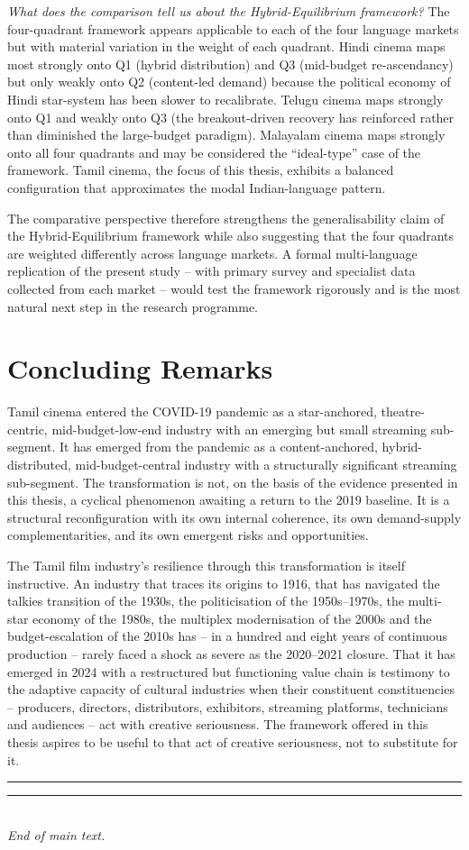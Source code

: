 \textit{What does the comparison tell us about the
Hybrid-Equilibrium framework?}  The four-quadrant framework appears
applicable to each of the four language markets but with
material variation in the weight of each quadrant.  Hindi cinema
maps most strongly onto Q1 (hybrid distribution) and Q3 (mid-budget
re-ascendancy) but only weakly onto Q2 (content-led demand)
because the political economy of Hindi star-system has been slower
to recalibrate.  Telugu cinema maps strongly onto Q1 and weakly
onto Q3 (the breakout-driven recovery has reinforced rather than
diminished the large-budget paradigm).  Malayalam cinema maps
strongly onto all four quadrants and may be considered the
``ideal-type'' case of the framework.  Tamil cinema, the focus of
this thesis, exhibits a balanced configuration that approximates
the modal Indian-language pattern.

The comparative perspective therefore strengthens the
generalisability claim of the Hybrid-Equilibrium framework while
also suggesting that the four quadrants are weighted differently
across language markets.  A formal multi-language replication of
the present study -- with primary survey and specialist data
collected from each market -- would test the framework rigorously
and is the most natural next step in the research programme.

\section{Concluding Remarks}
\label{sec:final_remarks}

Tamil cinema entered the COVID-19 pandemic as a star-anchored,
theatre-centric, mid-budget-low-end industry with an emerging but
small streaming sub-segment.  It has emerged from the pandemic as a
content-anchored, hybrid-distributed, mid-budget-central industry
with a structurally significant streaming sub-segment.  The
transformation is not, on the basis of the evidence presented in
this thesis, a cyclical phenomenon awaiting a return to the 2019
baseline.  It is a structural reconfiguration with its own
internal coherence, its own demand-supply complementarities, and
its own emergent risks and opportunities.

The Tamil film industry's resilience through this transformation
is itself instructive.  An industry that traces its origins to
1916, that has navigated the talkies transition of the 1930s, the
politicisation of the 1950s--1970s, the multi-star economy of the
1980s, the multiplex modernisation of the 2000s and the
budget-escalation of the 2010s has -- in a hundred and eight years
of continuous production -- rarely faced a shock as severe as the
2020--2021 closure.  That it has emerged in 2024 with a
restructured but functioning value chain is testimony to the
adaptive capacity of cultural industries when their constituent
constituencies -- producers, directors, distributors, exhibitors,
streaming platforms, technicians and audiences -- act with
creative seriousness.  The framework offered in this thesis aspires
to be useful to that act of creative seriousness, not to substitute
for it.

\bigskip\noindent
\rule{0.45\textwidth}{0.4pt}\hfill\rule{0.45\textwidth}{0.4pt}\\[2pt]
\textit{End of main text.}
